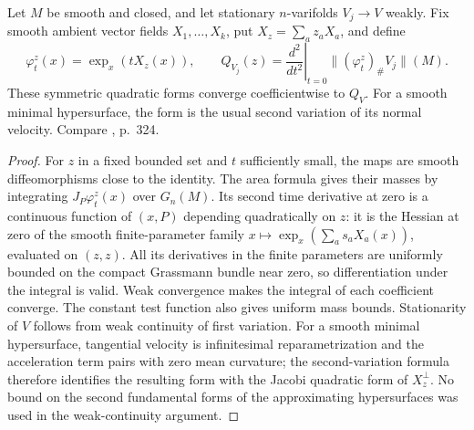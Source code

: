 \begin{lemma}\label{lem:weak-second-variation-continuity}
Let $M$ be smooth and closed, and let stationary $n$-varifolds $V_j\to V$ weakly. Fix smooth ambient vector fields $X_1,\ldots,X_k$, put $X_z=\sum_a z_aX_a$, and define
\[
 \varphi_t^z(x)=\exp_x(tX_z(x)),\qquad
 Q_{V_j}(z)=\left.\frac{d^2}{dt^2}\right|_{t=0}\|(\varphi_t^z)_\#V_j\|(M).
\]
These symmetric quadratic forms converge coefficientwise to $Q_V$. For a smooth minimal hypersurface, the form is the usual second variation of its normal velocity. Compare \cite{Sharp17}, p.~324.
\end{lemma}
\begin{proof}
For $z$ in a fixed bounded set and $t$ sufficiently small, the maps are smooth diffeomorphisms close to the identity. The area formula gives their masses by integrating $J_P\varphi_t^z(x)$ over $G_n(M)$. Its second time derivative at zero is a continuous function of $(x,P)$ depending quadratically on $z$: it is the Hessian at zero of the smooth finite-parameter family $x\mapsto\exp_x(\sum_a s_aX_a(x))$, evaluated on $(z,z)$. All its derivatives in the finite parameters are uniformly bounded on the compact Grassmann bundle near zero, so differentiation under the integral is valid.
Weak convergence makes the integral of each coefficient converge. The constant test function also gives uniform mass bounds. Stationarity of $V$ follows from weak continuity of first variation. For a smooth minimal hypersurface, tangential velocity is infinitesimal reparametrization and the acceleration term pairs with zero mean curvature; the second-variation formula therefore identifies the resulting form with the Jacobi quadratic form of $X_z^\perp$. No bound on the second fundamental forms of the approximating hypersurfaces was used in the weak-continuity argument.
\end{proof}

